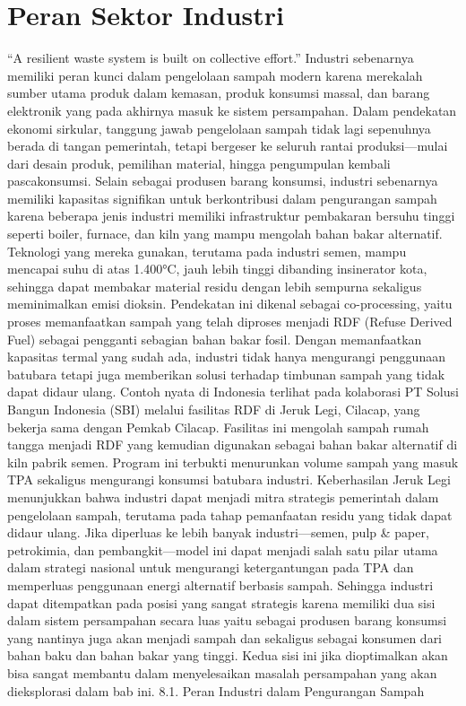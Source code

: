 \documentclass[
  letterpaper,
  DIV=11,
  numbers=noendperiod]{scrreprt}
\begin{document}

\chapter{Peran Sektor Industri}\label{peran-sektor-industri}

``A resilient waste system is built on collective effort.'' Industri
sebenarnya memiliki peran kunci dalam pengelolaan sampah modern karena
merekalah sumber utama produk dalam kemasan, produk konsumsi massal, dan
barang elektronik yang pada akhirnya masuk ke sistem persampahan. Dalam
pendekatan ekonomi sirkular, tanggung jawab pengelolaan sampah tidak
lagi sepenuhnya berada di tangan pemerintah, tetapi bergeser ke seluruh
rantai produksi---mulai dari desain produk, pemilihan material, hingga
pengumpulan kembali pascakonsumsi. Selain sebagai produsen barang
konsumsi, industri sebenarnya memiliki kapasitas signifikan untuk
berkontribusi dalam pengurangan sampah karena beberapa jenis industri
memiliki infrastruktur pembakaran bersuhu tinggi seperti boiler,
furnace, dan kiln yang mampu mengolah bahan bakar alternatif. Teknologi
yang mereka gunakan, terutama pada industri semen, mampu mencapai suhu
di atas 1.400°C, jauh lebih tinggi dibanding insinerator kota, sehingga
dapat membakar material residu dengan lebih sempurna sekaligus
meminimalkan emisi dioksin. Pendekatan ini dikenal sebagai
co-processing, yaitu proses memanfaatkan sampah yang telah diproses
menjadi RDF (Refuse Derived Fuel) sebagai pengganti sebagian bahan bakar
fosil. Dengan memanfaatkan kapasitas termal yang sudah ada, industri
tidak hanya mengurangi penggunaan batubara tetapi juga memberikan solusi
terhadap timbunan sampah yang tidak dapat didaur ulang. Contoh nyata di
Indonesia terlihat pada kolaborasi PT Solusi Bangun Indonesia (SBI)
melalui fasilitas RDF di Jeruk Legi, Cilacap, yang bekerja sama dengan
Pemkab Cilacap. Fasilitas ini mengolah sampah rumah tangga menjadi RDF
yang kemudian digunakan sebagai bahan bakar alternatif di kiln pabrik
semen. Program ini terbukti menurunkan volume sampah yang masuk TPA
sekaligus mengurangi konsumsi batubara industri. Keberhasilan Jeruk Legi
menunjukkan bahwa industri dapat menjadi mitra strategis pemerintah
dalam pengelolaan sampah, terutama pada tahap pemanfaatan residu yang
tidak dapat didaur ulang. Jika diperluas ke lebih banyak
industri---semen, pulp \& paper, petrokimia, dan pembangkit---model ini
dapat menjadi salah satu pilar utama dalam strategi nasional untuk
mengurangi ketergantungan pada TPA dan memperluas penggunaan energi
alternatif berbasis sampah. Sehingga industri dapat ditempatkan pada
posisi yang sangat strategis karena memiliki dua sisi dalam sistem
persampahan secara luas yaitu sebagai produsen barang konsumsi yang
nantinya juga akan menjadi sampah dan sekaligus sebagai konsumen dari
bahan baku dan bahan bakar yang tinggi. Kedua sisi ini jika dioptimalkan
akan bisa sangat membantu dalam menyelesaikan masalah persampahan yang
akan dieksplorasi dalam bab ini. 8.1. Peran Industri dalam Pengurangan
Sampah
\end{document}
